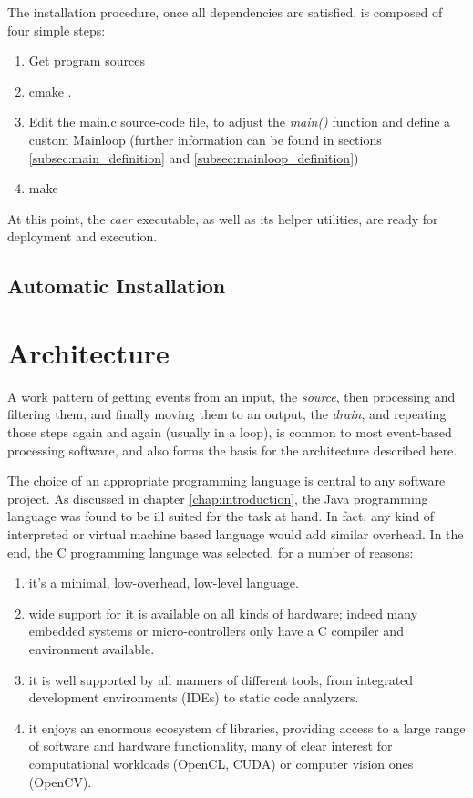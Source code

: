 \documentclass[a4paper,12pt]{report}
\begin{document}
The installation procedure, once all dependencies are satisfied, is composed of four simple steps:
\begin{enumerate}
\item Get program sources
\item cmake .
\item Edit the main.c source-code file, to adjust the \emph{main()} function and define a custom Mainloop (further information can be found in sections \ref{subsec:main_definition} and \ref{subsec:mainloop_definition})
\item make
\end{enumerate}

At this point, the \emph{caer} executable, as well as its helper utilities, are ready for deployment and execution.

\section{Automatic Installation} \label{sec:automatic_installation}

\chapter{Architecture} \label{chap:architecture}

A work pattern of getting events from an input, the \emph{source}, then processing and filtering them, and finally moving them to an output, the \emph{drain}, and repeating those steps again and again (usually in a loop), is common to most event-based processing software, and also forms the basis for the architecture described here.

The choice of an appropriate programming language is central to any software project.
As discussed in chapter \ref{chap:introduction}, the Java programming language was found to be ill suited for the task at hand. In fact, any kind of interpreted or virtual machine based language would add similar overhead.
In the end, the C programming language was selected, for a number of reasons:
\begin{enumerate}
\item it's a minimal, low-overhead, low-level language.
\item wide support for it is available on all kinds of hardware; indeed many embedded systems or micro-controllers only have a C compiler and environment available.
\item it is well supported by all manners of different tools, from integrated development environments (IDEs) to static code analyzers.
\item it enjoys an enormous ecosystem of libraries, providing access to a large range of software and hardware functionality, many of clear interest for computational workloads (OpenCL, CUDA) or computer vision ones (OpenCV).
\end{enumerate}
\end{document}

